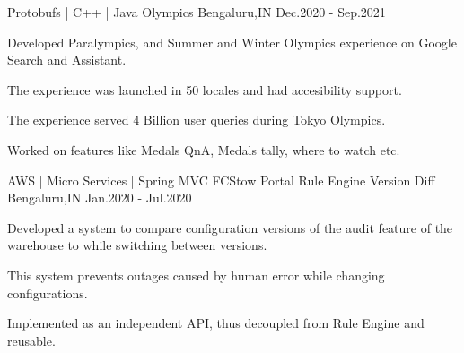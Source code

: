 


\begin{cventries}


\cventry
{Protobufs | C++ | Java} %
{Olympics} %
{Bengaluru,IN} %
{Dec.2020 - Sep.2021} %
{ %
\begin{cvitems}
\item {Developed Paralympics, and Summer and Winter Olympics experience on Google Search and Assistant.}
\item {The experience was launched in 50 locales and had accesibility support.}
\item {The experience served 4 Billion user queries during Tokyo Olympics.}
\item {Worked on features like Medals QnA, Medals tally, where to watch etc.}
\end{cvitems}
}


\cventry
{AWS | Micro Services | Spring MVC} %
{FCStow Portal Rule Engine Version Diff} %
{Bengaluru,IN} %
{Jan.2020 - Jul.2020} %
{ %
\begin{cvitems}
\item {Developed a system to compare configuration versions of the audit feature of the warehouse to while switching between versions.}
\item {This system prevents outages caused by human error while changing configurations.}
\item {Implemented as an independent API, thus decoupled from Rule Engine and reusable.}
\end{cvitems}
}



\end{cventries}
